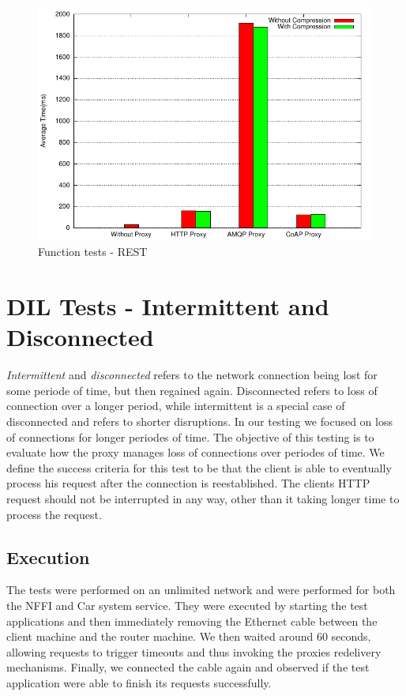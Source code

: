 \begin{figure}[H]
\center
\includegraphics[scale=0.75]{../results/function_tests/rest/result.pdf}
\caption{Function tests - REST}
\end{figure}


\section{DIL Tests - Intermittent and Disconnected}

\textit{Intermittent} and \textit{disconnected} refers to the network connection
being lost for some periode of time, but then regained again. Disconnected
refers to loss of connection over a longer period, while intermittent is a
special case of disconnected and refers to shorter disruptions. In our testing
we focused on loss of connections for longer periodes of time. The objective of
this testing is to evaluate how the proxy manages loss of connections over
periodes of time. We define the success criteria for this test to be that the
client is able to eventually process his request after the connection is
reestablished. The clients HTTP request should not be interrupted in any way,
other than it taking longer time to process the request.

\subsection{Execution}

 The tests were performed on an unlimited network and were performed for
 both the NFFI and Car system service. They were executed by starting the test
 applications and then immediately removing the Ethernet cable between the
 client machine and the router machine. We then waited around 60 seconds,
 allowing requests to trigger timeouts and thus invoking the proxies redelivery
 mechanisms. Finally, we connected the cable again and observed if the test
 application were able to finish its requests successfully.


